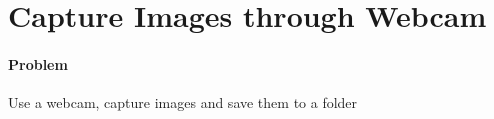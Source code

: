 \section{Capture Images through Webcam}

\paragraph{Problem}
Use a webcam, capture images and save them to a folder
